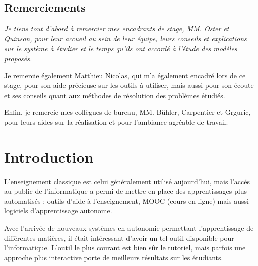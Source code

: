 \documentclass[stage]{tnreport}
\begin{document}
\maketitle
{}


\cleardoublepage

\makesecondtitle

\section*{Remerciements}

{\em
Je tiens tout d'abord à remercier mes encadrants de stage, MM. Oster et Quinson, pour leur accueil au sein de leur équipe, leurs conseils et explications sur le système à étudier et le temps qu'ils ont accordé à l'étude des modèles proposés.

Je remercie également Matthieu Nicolas, qui m'a également encadré lors de ce stage, pour son aide précieuse sur les outils à utiliser, mais aussi pour son écoute et ses conseils quant aux méthodes de résolution des problèmes étudiés.

Enfin, je remercie mes collègues de bureau, MM. Bühler, Carpentier et Grguric, pour leurs aides sur la réalisation et pour l'ambiance agréable de travail.
}

\cleardoublepage

\renewcommand{\baselinestretch}{0.5}\normalsize
\tableofcontents
\renewcommand{\baselinestretch}{1.0}\normalsize
\cleardoublepage

\setcounter{page}{1}

\chapter*{Introduction}

L'enseignement classique est celui généralement utilisé aujourd'hui, mais l'accés au public de l'informatique a permi de mettre en place des apprentissages plus automatisés : outils d'aide à l'enseignement, MOOC (cours en ligne) mais aussi logiciels d'apprentissage autonome.

Avec l'arrivée de nouveaux systèmes en autonomie permettant l'apprentissage de différentes matières, il était intéressant d'avoir un tel outil disponible pour l'informatique. L'outil le plus courant est bien sûr le tutoriel, mais parfois une approche plus interactive porte de meilleurs résultats sur les étudiants.
\end{document}
